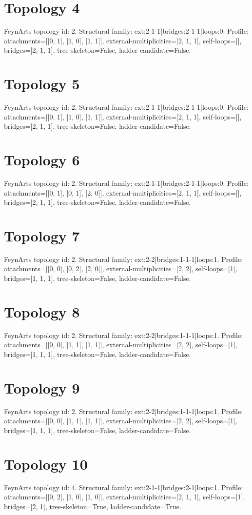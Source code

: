 \documentclass{article}
\begin{document}
\section*{Topology 4}
FeynArts topology id: 2.
Structural family: ext:2-1-1|bridges:2-1-1|loops:0.
Profile: attachments=[[0, 1], [1, 0], [1, 1]], external-multiplicities=[2, 1, 1], self-loops=[], bridges=[2, 1, 1], tree-skeleton=False, ladder-candidate=False.
\section*{Topology 5}
FeynArts topology id: 2.
Structural family: ext:2-1-1|bridges:2-1-1|loops:0.
Profile: attachments=[[0, 1], [1, 0], [1, 1]], external-multiplicities=[2, 1, 1], self-loops=[], bridges=[2, 1, 1], tree-skeleton=False, ladder-candidate=False.
\section*{Topology 6}
FeynArts topology id: 2.
Structural family: ext:2-1-1|bridges:2-1-1|loops:0.
Profile: attachments=[[0, 1], [0, 1], [2, 0]], external-multiplicities=[2, 1, 1], self-loops=[], bridges=[2, 1, 1], tree-skeleton=False, ladder-candidate=False.
\section*{Topology 7}
FeynArts topology id: 2.
Structural family: ext:2-2|bridges:1-1-1|loops:1.
Profile: attachments=[[0, 0], [0, 2], [2, 0]], external-multiplicities=[2, 2], self-loops=[1], bridges=[1, 1, 1], tree-skeleton=False, ladder-candidate=False.
\section*{Topology 8}
FeynArts topology id: 2.
Structural family: ext:2-2|bridges:1-1-1|loops:1.
Profile: attachments=[[0, 0], [1, 1], [1, 1]], external-multiplicities=[2, 2], self-loops=[1], bridges=[1, 1, 1], tree-skeleton=False, ladder-candidate=False.
\section*{Topology 9}
FeynArts topology id: 2.
Structural family: ext:2-2|bridges:1-1-1|loops:1.
Profile: attachments=[[0, 0], [1, 1], [1, 1]], external-multiplicities=[2, 2], self-loops=[1], bridges=[1, 1, 1], tree-skeleton=False, ladder-candidate=False.
\section*{Topology 10}
FeynArts topology id: 4.
Structural family: ext:2-1-1|bridges:2-1|loops:1.
Profile: attachments=[[0, 2], [1, 0], [1, 0]], external-multiplicities=[2, 1, 1], self-loops=[1], bridges=[2, 1], tree-skeleton=True, ladder-candidate=True.
\end{document}

